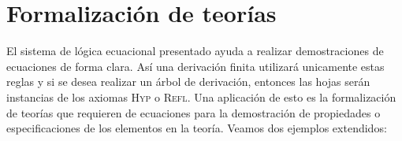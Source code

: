 \documentclass[11pt,letterpaper]{article}
\begin{document}
% 
% 

\section{Formalizaci\'on de teor\'ias}
El sistema de l\'ogica ecuacional presentado ayuda a realizar demostraciones 
de ecuaciones de forma clara. 
As\'i una derivaci\'on finita utilizar\'a unicamente estas reglas y si se desea 
realizar un \'arbol de derivaci\'on, entonces las hojas ser\'an instancias de 
los axiomas \textsc{Hyp} o \textsc{Refl}.
Una aplicaci\'on de esto es la formalizaci\'on de teor\'ias que requieren de 
ecuaciones para la demostraci\'on de propiedades o especificaciones de los 
elementos en la teor\'ia. 
Veamos dos ejemplos extendidos:
\end{document}
